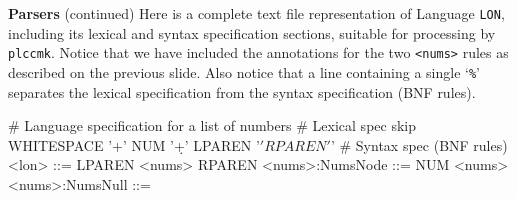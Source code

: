 \begin{minipage}[t]{\sw}
\slidenumber
\LARGE
{\bf Parsers} (continued)\exx
Here is a complete text file representation
of {\color{red}Language \verb'LON'},
including its lexical and syntax specification sections,
suitable for processing by \verb'plccmk'.
Notice that we have included the annotations
for the two \verb'<nums>' rules as described on the previous slide.
Also notice that a line containing a single `\verb'%'' separates
the lexical specification from the syntax specification (BNF rules).\exx
\begin{SaveVerbatim}{\MYlonGrammar}
# Language specification for a list of numbers
# Lexical spec
skip WHITESPACE '\s+'
NUM '\d+'
LPAREN '\('
RPAREN '\)'
%
# Syntax spec (BNF rules)
<lon>           ::= LPAREN <nums> RPAREN
<nums>:NumsNode ::= NUM <nums>
<nums>:NumsNull ::= 
%
\end{SaveVerbatim}
\emm\NormalBox{\MYlonGrammar}\exx
\end{minipage}
\clearpage
